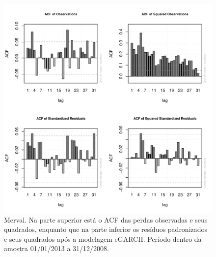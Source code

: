 \documentclass[review]{elsarticle}
\theoremstyle{definition}
\begin{document}
\begin{figure}[H]
	\centering
	\includegraphics[width=1\linewidth]{figs/artigo-acf-Merval}
	\caption{Merval. Na parte superior está o ACF das perdas observadas e seus quadrados, enquanto que na parte inferior os resíduos padronizados e seus quadrados após a modelagem eGARCH. Período dentro da amostra 01/01/2013 a 31/12/2008.}
	\label{fig:artigo-acf-merval}
\end{figure}
\end{document}
